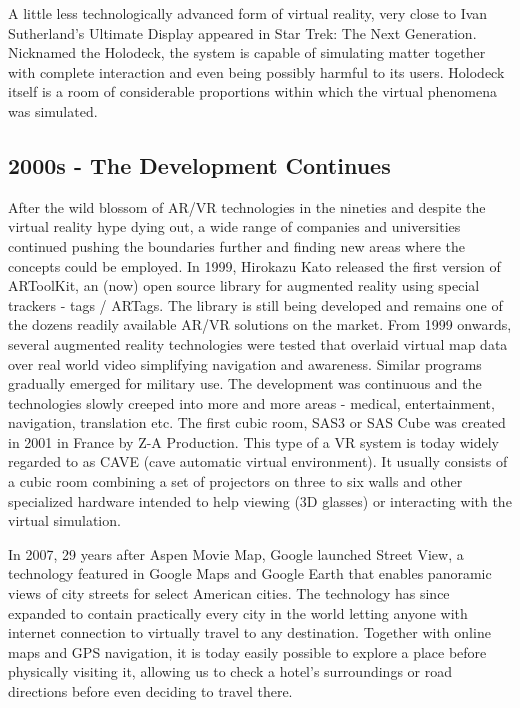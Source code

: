\documentclass[12pt, a4paper]{article}
\begin{document}
A little less technologically advanced form of virtual reality, very close to Ivan Sutherland’s Ultimate Display appeared in Star Trek: The Next Generation. Nicknamed the Holodeck, the system is capable of simulating matter together with complete interaction and even being possibly harmful to its users. Holodeck itself is a room of considerable proportions within which the virtual phenomena was simulated.

\subsection{2000s - The Development Continues}

After the wild blossom of AR/VR technologies in the nineties and despite the virtual reality hype dying out, a wide range of companies and universities continued pushing the boundaries further and finding new areas where the concepts could be employed. In 1999, Hirokazu Kato released the first version of ARToolKit, an (now) open source library for augmented reality using special trackers - tags / ARTags. The library is still being developed and  remains one of the dozens readily available AR/VR solutions on the market. From 1999 onwards, several augmented reality technologies were tested that overlaid virtual map data over real world video simplifying navigation and awareness. Similar programs gradually emerged for military use. The development was continuous and the technologies slowly creeped into more and more areas - medical, entertainment, navigation, translation etc. The first cubic room, SAS3 or SAS Cube was created in 2001 in France by Z-A Production. This type of a VR system is today widely regarded to as CAVE (cave automatic virtual environment). It usually consists of a cubic room combining a set of projectors on three to six walls and other specialized hardware intended to help viewing (3D glasses) or interacting with the virtual simulation.

In 2007, 29 years after Aspen Movie Map, Google launched Street View, a technology featured in Google Maps and Google Earth that enables panoramic views of city streets for select American cities. The technology has since expanded to contain practically every city in the world letting anyone with internet connection to virtually travel to any destination. Together with online maps and GPS navigation, it is today easily possible to explore a place before physically visiting it, allowing us to check a hotel’s surroundings or road directions before even deciding to travel there.
\end{document}
